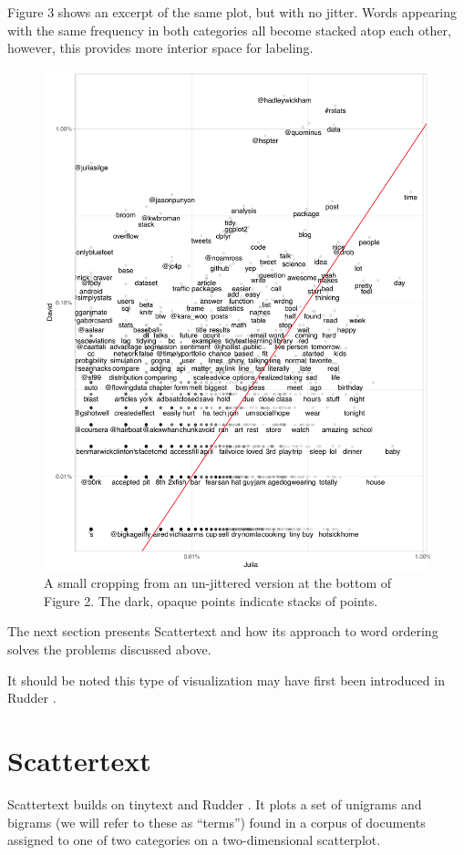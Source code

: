 \documentclass[11pt,a4paper]{article}
\begin{document}
Figure 3 shows an excerpt of the same plot, but with no jitter.  Words appearing with the same frequency in both categories all become stacked atop each other, however, this provides more interior space for labeling. 
\begin{figure}[h]
\vspace{-.25cm}
\includegraphics[width=\columnwidth]{tidytext_horiz}
\caption{A small cropping from an un-jittered version at the bottom of Figure 2.  The dark, opaque points indicate stacks of points.}
\label{nojitterfig}
\vspace{-.25cm}
\end{figure}
The next section presents Scattertext and how its approach to word ordering solves the problems discussed above.

It should be noted this type of visualization may have first been introduced in Rudder .
\section{Scattertext}
\label{scattertext}
Scattertext builds on tinytext and Rudder .  It plots a set of unigrams and bigrams (we will refer to these as ``terms'') found in a corpus of documents assigned to one of two categories on a two-dimensional scatterplot.  
\end{document}
